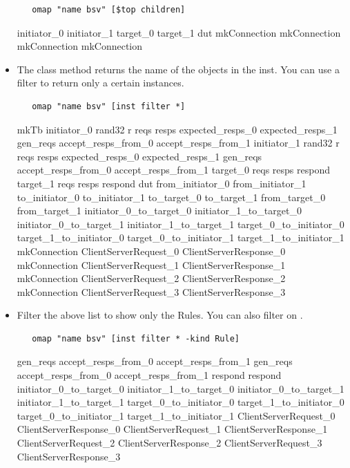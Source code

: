 \begin{itemize}
\begin{verbatim}
   omap "name bsv" [$top children]
\end{verbatim}
\begin{codebox}
initiator_0 initiator_1 target_0 target_1 dut mkConnection mkConnection 
mkConnection mkConnection
\end{codebox}


\item The  class method returns the name of the objects
in the inst.   You can use a filter  to return only a certain
instances. 

\begin{verbatim}
   omap "name bsv" [inst filter *]
\end{verbatim}
\begin{codebox}
mkTb initiator_0 rand32 r reqs resps expected_resps_0 expected_resps_1
gen_reqs accept_resps_from_0 accept_resps_from_1 initiator_1 rand32 r
reqs resps expected_resps_0 expected_resps_1 gen_reqs
accept_resps_from_0 accept_resps_from_1 target_0 reqs resps respond
target_1 reqs resps respond dut from_initiator_0 from_initiator_1
to_initiator_0 to_initiator_1 to_target_0 to_target_1 from_target_0
from_target_1 initiator_0_to_target_0 initiator_1_to_target_0
initiator_0_to_target_1 initiator_1_to_target_1
target_0_to_initiator_0 target_1_to_initiator_0
target_0_to_initiator_1 target_1_to_initiator_1 mkConnection
ClientServerRequest_0 ClientServerResponse_0 mkConnection
ClientServerRequest_1 ClientServerResponse_1 mkConnection
ClientServerRequest_2 ClientServerResponse_2 mkConnection
ClientServerRequest_3 ClientServerResponse_3 
\end{codebox}

\item  Filter the above list to show only the Rules.  You can also
filter on .

\begin{verbatim}
   omap "name bsv" [inst filter * -kind Rule]
\end{verbatim}
\begin{codebox}
gen_reqs accept_resps_from_0 accept_resps_from_1 gen_reqs
accept_resps_from_0 accept_resps_from_1 respond respond
initiator_0_to_target_0 initiator_1_to_target_0
initiator_0_to_target_1 initiator_1_to_target_1
target_0_to_initiator_0 target_1_to_initiator_0
target_0_to_initiator_1 target_1_to_initiator_1 ClientServerRequest_0
ClientServerResponse_0 ClientServerRequest_1 ClientServerResponse_1
ClientServerRequest_2 ClientServerResponse_2 ClientServerRequest_3
ClientServerResponse_3 
\end{codebox}



\end{itemize}
